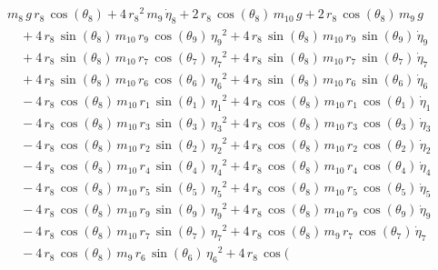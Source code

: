 \begin{eqnarray*} && m_{8}\,g\,r_{8}\,\cos({\theta_{8}}) + 4\,{r_{8}}^
2\,m_{9}\,{\dot{\eta}_{8}} + 2\,r_{8}\,\cos({\theta_{8}})\,m_{10}\,g
 + 2\,r_{8}\,\cos({\theta_{8}})\,m_{9}\,g \\ &&\quad\mbox{} + 4\,r_{8}
\,\sin({\theta_{8}})\,m_{10}\,r_{9}\,\cos({\theta_{9}})\,{{\eta_{9}}}^
2 + 4\,r_{8}\,\sin({\theta_{8}})\,m_{10}\,r_{9}\,\sin({\theta_{9}})\,{
\dot{\eta}_{9}} \\ &&\quad\mbox{} + 4\,r_{8}\,\sin({\theta_{8}})\,m_{
10}\,r_{7}\,\cos({\theta_{7}})\,{{\eta_{7}}}^2 + 4\,r_{8}\,\sin({
\theta_{8}})\,m_{10}\,r_{7}\,\sin({\theta_{7}})\,{\dot{\eta}_{7}}
 \\ &&\quad\mbox{} + 4\,r_{8}\,\sin({\theta_{8}})\,m_{10}\,r_{6}\,\cos
({\theta_{6}})\,{{\eta_{6}}}^2 + 4\,r_{8}\,\sin({\theta_{8}})\,m_{10}
\,r_{6}\,\sin({\theta_{6}})\,{\dot{\eta}_{6}} \\ &&\quad\mbox{} - 4\,r
_{8}\,\cos({\theta_{8}})\,m_{10}\,r_{1}\,\sin({\theta_{1}})\,{{\eta_{1
}}}^2 + 4\,r_{8}\,\cos({\theta_{8}})\,m_{10}\,r_{1}\,\cos({\theta_{1}}
)\,{\dot{\eta}_{1}} \\ &&\quad\mbox{} - 4\,r_{8}\,\cos({\theta_{8}})\,
m_{10}\,r_{3}\,\sin({\theta_{3}})\,{{\eta_{3}}}^2 + 4\,r_{8}\,\cos({
\theta_{8}})\,m_{10}\,r_{3}\,\cos({\theta_{3}})\,{\dot{\eta}_{3}}
 \\ &&\quad\mbox{} - 4\,r_{8}\,\cos({\theta_{8}})\,m_{10}\,r_{2}\,\sin
({\theta_{2}})\,{{\eta_{2}}}^2 + 4\,r_{8}\,\cos({\theta_{8}})\,m_{10}
\,r_{2}\,\cos({\theta_{2}})\,{\dot{\eta}_{2}} \\ &&\quad\mbox{} - 4\,r
_{8}\,\cos({\theta_{8}})\,m_{10}\,r_{4}\,\sin({\theta_{4}})\,{{\eta_{4
}}}^2 + 4\,r_{8}\,\cos({\theta_{8}})\,m_{10}\,r_{4}\,\cos({\theta_{4}}
)\,{\dot{\eta}_{4}} \\ &&\quad\mbox{} - 4\,r_{8}\,\cos({\theta_{8}})\,
m_{10}\,r_{5}\,\sin({\theta_{5}})\,{{\eta_{5}}}^2 + 4\,r_{8}\,\cos({
\theta_{8}})\,m_{10}\,r_{5}\,\cos({\theta_{5}})\,{\dot{\eta}_{5}}
 \\ &&\quad\mbox{} - 4\,r_{8}\,\cos({\theta_{8}})\,m_{10}\,r_{9}\,\sin
({\theta_{9}})\,{{\eta_{9}}}^2 + 4\,r_{8}\,\cos({\theta_{8}})\,m_{10}
\,r_{9}\,\cos({\theta_{9}})\,{\dot{\eta}_{9}} \\ &&\quad\mbox{} - 4\,r
_{8}\,\cos({\theta_{8}})\,m_{10}\,r_{7}\,\sin({\theta_{7}})\,{{\eta_{7
}}}^2 + 4\,r_{8}\,\cos({\theta_{8}})\,m_{9}\,r_{7}\,\cos({\theta_{7}})
\,{\dot{\eta}_{7}} \\ &&\quad\mbox{} - 4\,r_{8}\,\cos({\theta_{8}})\,m
_{9}\,r_{6}\,\sin({\theta_{6}})\,{{\eta_{6}}}^2 + 4\,r_{8}\,\cos({
}
\end{eqnarray*}
